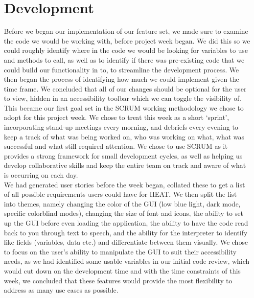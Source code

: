 \section{\textbf{Development}}

Before we began our implementation of our feature set, we made sure to examine the code we would be working with, before project week began. We did this so we could roughly identify where in the code we would be looking for variables to use and methods to call, as well as to identify if there was pre-existing code that we could build our functionality in to, to streamline the development process. We then began the process of identifying how much we could implement given the time frame. We concluded that all of our changes should be optional for the user to view, hidden in an accessibility toolbar which we can toggle the visibility of. This became our first goal set in the SCRUM working methodology we chose to adopt for this project week. We chose to treat this week as a short ‘sprint’, incorporating stand-up meetings every morning, and debriefs every evening to keep a track of what was being worked on, who was working on what, what was successful and what still required attention. We chose to use SCRUM as it provides a strong framework for small development cycles, as well as helping us develop collaborative skills and keep the entire team on track and aware of what is occurring on each day. \\

We had generated user stories before the week began, collated these to get a list of all possible requirements users could have for HEAT. We then split the list into themes, namely changing the color of the GUI (low blue light, dark mode, specific colorblind modes), changing the size of font and icons, the ability to set up the GUI before even loading the application, the ability to have the code read back to you through text to speech, and the ability for the interpreter to identify like fields (variables, data etc.) and differentiate between them visually. We chose to focus on the user’s ability to manipulate the GUI to suit their accessibility needs, as we had identified some usable variables in our initial code review, which would cut down on the development time and with the time constraints of this week, we concluded that these features would provide the most flexibility to address as many use cases as possible. \\

